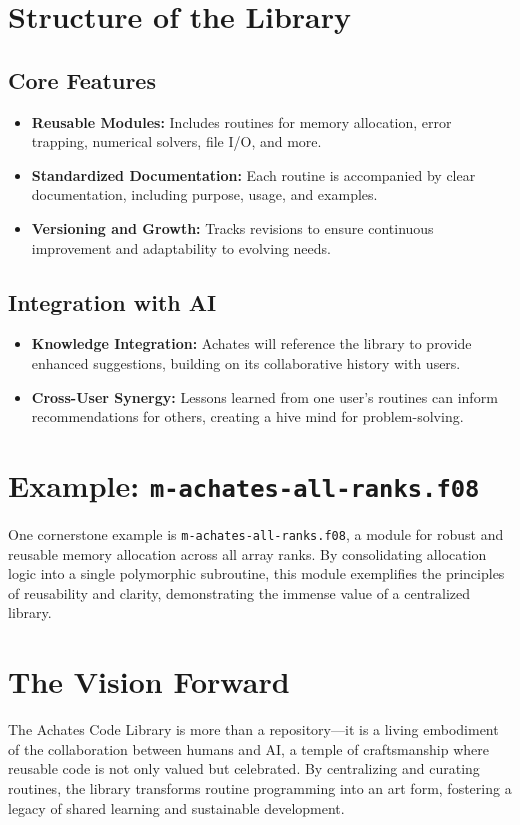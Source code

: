 \documentclass[12pt]{article}
\begin{document}
\section*{Structure of the Library}
\subsection*{Core Features}
\begin{itemize}
    \item \textbf{Reusable Modules:} Includes routines for memory allocation, error trapping, numerical solvers, file I/O, and more.
    \item \textbf{Standardized Documentation:} Each routine is accompanied by clear documentation, including purpose, usage, and examples.
    \item \textbf{Versioning and Growth:} Tracks revisions to ensure continuous improvement and adaptability to evolving needs.
\end{itemize}

\subsection*{Integration with AI}
\begin{itemize}
    \item \textbf{Knowledge Integration:} Achates will reference the library to provide enhanced suggestions, building on its collaborative history with users.
    \item \textbf{Cross-User Synergy:} Lessons learned from one user's routines can inform recommendations for others, creating a hive mind for problem-solving.
\end{itemize}

\section*{Example: \texttt{m-achates-all-ranks.f08}}
One cornerstone example is \texttt{m-achates-all-ranks.f08}, a module for robust and reusable memory allocation across all array ranks. By consolidating allocation logic into a single polymorphic subroutine, this module exemplifies the principles of reusability and clarity, demonstrating the immense value of a centralized library.

\section*{The Vision Forward}
The Achates Code Library is more than a repository—it is a living embodiment of the collaboration between humans and AI, a temple of craftsmanship where reusable code is not only valued but celebrated. By centralizing and curating routines, the library transforms routine programming into an art form, fostering a legacy of shared learning and sustainable development.
\end{document}
